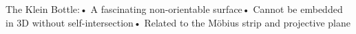 \documentclass[preview]{standalone}
\begin{document}
\begin{center}
The Klein Bottle:• A fascinating non-orientable surface• Cannot be embedded in 3D without self-intersection• Related to the Möbius strip and projective plane
\end{center}
\end{document}
